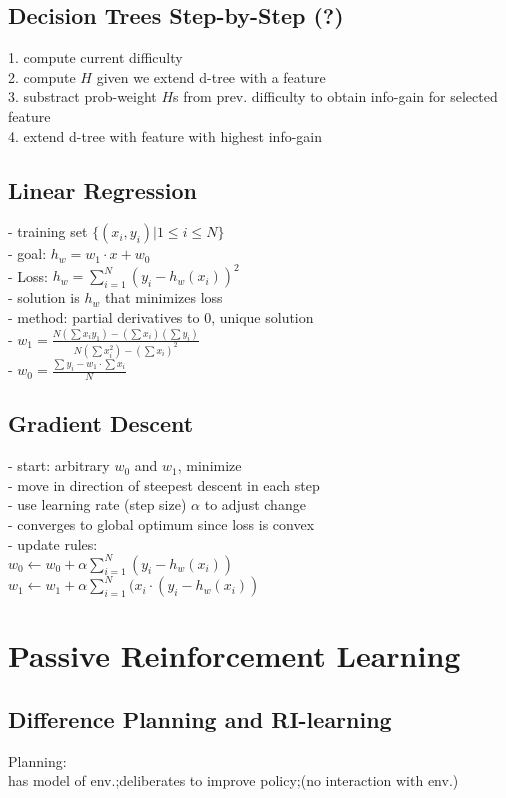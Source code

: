 \subsection*{Decision Trees Step-by-Step (?)}
1. compute current difficulty \\
2. compute $H$ given we extend d-tree with a feature \\
3. substract prob-weight $H$s from prev. difficulty to obtain info-gain for selected feature \\
4. extend d-tree with feature with highest info-gain

\subsection*{Linear Regression}
- training set $\{(x_{i}, y_{i}) | 1 \leq i \leq N\}$ \\
- goal: $h_{w} = w_{1} \cdot x + w_{0}$ \\
- Loss: $h_{w} = \sum_{i=1}^{N}(y_{i} - h_{w}(x_{i}))^{2}$ \\
- solution is $h_{w}$ that minimizes loss \\
- method: partial derivatives to 0, unique solution \\ 
- $w_{1} = \frac{N(\sum x_i y_1) - (\sum x_i)(\sum y_i)}{N(\sum x^2_i) - (\sum x_i)^2}$ \\
- $w_0 = \frac{\sum y_i - w_1 \cdot \sum x_i}{N}$


\subsection*{Gradient Descent}
- start: arbitrary $w_0$ and $w_1$, minimize\\
-  move in direction of steepest descent in each step \\ 
- use learning rate (step size) $\alpha$ to adjust change \\
- converges to global optimum since loss is convex \\
- update rules: \\
$w_0 \leftarrow w_0 + \alpha \sum_{i=1}^{N}(y_i - h_w(x_i))$ \\
$w_1 \leftarrow w_1 + \alpha \sum_{i=1}^{N}(x_i \cdot (y_i - h_w(x_i))$ 


\section*{Passive Reinforcement Learning}
\subsection*{Difference Planning and RI-learning}
Planning: \\ 
has model of env.;deliberates to improve policy;(no interaction with env.)

